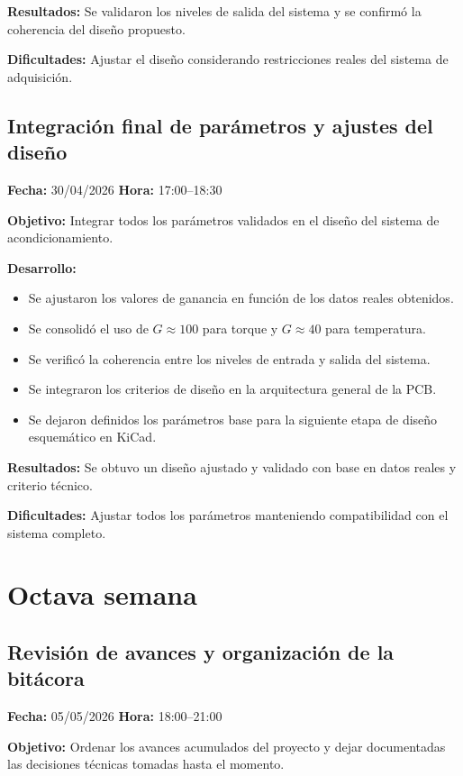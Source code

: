 \documentclass[12pt]{article}
\begin{document}
\textbf{Resultados:}
Se validaron los niveles de salida del sistema y se confirmó la coherencia del diseño propuesto.

\textbf{Dificultades:}
Ajustar el diseño considerando restricciones reales del sistema de adquisición.

\subsection{Integración final de parámetros y ajustes del diseño}
\textbf{Fecha:} 30/04/2026 \quad \textbf{Hora:} 17:00--18:30

\textbf{Objetivo:}
Integrar todos los parámetros validados en el diseño del sistema de acondicionamiento.

\textbf{Desarrollo:}
\begin{itemize}
\item Se ajustaron los valores de ganancia en función de los datos reales obtenidos.
\item Se consolidó el uso de \(G \approx 100\) para torque y \(G \approx 40\) para temperatura.
\item Se verificó la coherencia entre los niveles de entrada y salida del sistema.
\item Se integraron los criterios de diseño en la arquitectura general de la PCB.
\item Se dejaron definidos los parámetros base para la siguiente etapa de diseño esquemático en KiCad.
\end{itemize}

\textbf{Resultados:}
Se obtuvo un diseño ajustado y validado con base en datos reales y criterio técnico.

\textbf{Dificultades:}
Ajustar todos los parámetros manteniendo compatibilidad con el sistema completo.


\section{Octava semana}

\subsection{Revisión de avances y organización de la bitácora}
\textbf{Fecha:} 05/05/2026 \quad \textbf{Hora:} 18:00--21:00

\textbf{Objetivo:}
Ordenar los avances acumulados del proyecto y dejar documentadas las decisiones técnicas tomadas hasta el momento.
\end{document}
